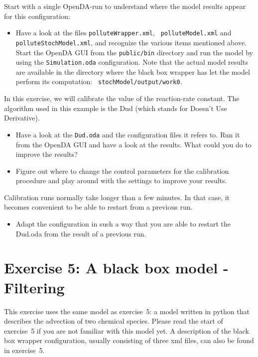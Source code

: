 \documentclass[a4paper,10pt]{article}
\begin{document}
Start with a single OpenDA-run to understand where the model results appear
for this configuration:
\begin{itemize}
 \item Have a look at the files {\tt polluteWrapper.xml}, {\tt
   polluteModel.xml} and {\tt polluteStochModel.xml}, and recognize the various
   items mentioned above. Start the OpenDA GUI from the {\tt public/bin}
   directory and run the model by using the {\tt Simulation.oda} configuration.
   Note that the actual model results are available in the directory where the
   black box wrapper has let the model perform its computation: {\tt
     stochModel/output/work0}.
\end{itemize}

In this exercise, we will calibrate the value of the reaction-rate constant.
The algorithm used in this example is the Dud (which stands for Doesn't Use
Derivative).

\begin{itemize}
\item Have a look at the {\tt Dud.oda} and the configuration files it refers
  to. Run it from the OpenDA GUI and have a look at the results. What could you
  do to improve the results?

\item Figure out where to change the control parameters for the calibration
  procedure and play around with the settings to improve your results.

\end{itemize}

Calibration runs normally take longer than a few minutes. In that case, it
becomes convenient to be able to restart from a previous run.

\begin{itemize}
\item Adapt the configuration in such a way that you are able to restart the
  Dud.oda from the result of a previous run.
\end{itemize}

\section{Exercise 5: A black box model - Filtering}

This exercise uses the same model as exercise~5: a model written in python that
describes the advection of two chemical species. Please read the start of
exercise~5 if you are not familiar with this model yet. A description of the
black box wrapper configuration, usually consisting of three xml files, can
also be found in exercise~5.
\end{document}
